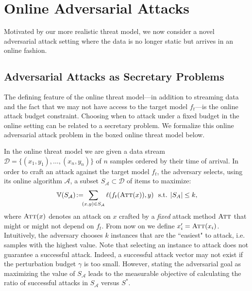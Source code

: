 \section{Online Adversarial Attacks}
\label{online_adversarial_attacks}
Motivated by our more realistic threat model, we now consider a novel adversarial attack setting where the data is no longer static but arrives in an online fashion.

\subsection{Adversarial Attacks as Secretary Problems}
\label{adv_sec_problem}
The defining feature of the online threat model---in addition to streaming data and the fact that we may not have access to the target model $f_t$---is the online attack budget constraint.
Choosing when to attack under a fixed budget in the online setting can be related to a secretary problem. We formalize this online adversarial attack problem in the boxed online threat model below.

In the online threat model we are given a data stream $\mathcal{D}=\{(x_1,y_1),\ldots,(x_n,y_n)\}$ of $n$ samples ordered by their time of arrival. In order to craft an attack against the target model $f_t$, the adversary selects, using its online algorithm $\mathcal{A}$, a subset $S_{\mathcal{A}} \subset \mathcal{D}$ of items to maximize: %
\begin{equation}\label{eq:asp}
   \mathbb{V}(S_\mathcal{A}) \! := \!\!\! \sum_{ (x,y) \in S_\mathcal{A}} \ell(f_{t}(\textsc{Att}(x)),y) \ \text{ s.t. } 
   |S_A| \leq k,\hspace{-1mm} 
\end{equation}
where $\textsc{Att}(x)$ denotes an attack on $x$ crafted by a \emph{fixed} attack method $\textsc{Att}$ that might or might not depend on $f_t$. From now on we define $x_i'=\textsc{Att}(x_i)$. 
Intuitively, the adversary chooses $k$ instances that are the ``easiest" to attack, i.e. samples with the highest value. Note that selecting an instance to attack does not guarantee a successful attack.
Indeed, a successful attack vector may not exist if the perturbation budget $\gamma$ is too small.  However, stating the adversarial goal as maximizing the value of $S_{\mathcal{A}}$ leads to the measurable objective of calculating the ratio of successful attacks in $S_{\mathcal{A}}$ versus $S^*$.

